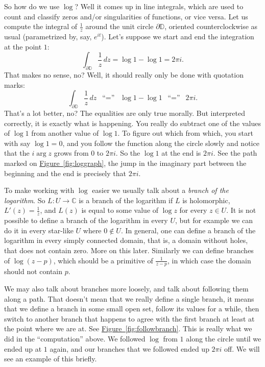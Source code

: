 \documentclass[12pt,openany]{book}
\newcommand{\C}{{\mathbb{C}}}
\newcommand{\D}{{\mathbb{D}}}
\newcommand{\myindex}[1]{#1\index{#1}}
\theoremstyle{plain}
\theoremstyle{remark}
\theoremstyle{definition}
\theoremstyle{exercise}
\theoremstyle{example}
\newcommand{\figureref}[1]{\hyperref[#1]{Figure~\ref*{#1}}}
\begin{document}
So how do we use $\log$?  Well it comes up in line integrals, which are used
to count and classify zeros and/or singularities of functions, or vice
versa.  Let us compute the integral of $\frac{1}{z}$ around the unit
circle $\partial \D$, oriented counterclockwise as usual (parametrized
by, say, $e^{it}$).  Let's suppose we start and end the integration at the
point $1$:
\begin{equation*}
\int_{\partial \D} \frac{1}{z} \, dz
= \log 1 - \log 1 = 2\pi i.
\end{equation*}
That makes no sense, no?  Well, it should really only be done
with quotation marks:
\begin{equation*}
\int_{\partial \D} \frac{1}{z} \, dz
\enspace
\text{``$=$''}
\enspace
\log 1 - \log 1
\enspace
\text{``$=$''}
\enspace
2\pi i.
\end{equation*}
That's a lot better, no?  The equalities are only true morally.  But
interpreted correctly, it is exactly what is happening.  You really do subtract
one of the values of $\log 1$ from another value of $\log 1$.  To figure
out which from which, you start with say $\log 1 = 0$, and you follow the
function along the circle slowly and notice that the $i \arg z$ grows from $0$ to
$2\pi i$.  So the $\log 1$ at the end is $2 \pi i$.  See the path
marked on \figureref{fig:loggraph}, the jump in the imaginary part between
the beginning and the end is precisely that $2\pi i$.

To make working with $\log$ easier we usually talk about a
\emph{\myindex{branch of the logarithm}}.  So $L \colon U \to \C$ is a branch
of the logarithm if $L$ is holomorphic, $L'(z) = \frac{1}{z}$, and $L(z)$ is equal
to some value of $\log z$ for every $z \in U$.  It is not possible to define
a branch of the logarithm in every $U$, but for example we can do it in every
star-like $U$ where $0 \notin U$.  In general, one can define a branch of
the logarithm in every simply connected domain, that is, a domain without holes,
that does not contain zero.
More on this later.  Similarly we can define branches of $\log (z-p)$, which
should be a primitive of $\frac{1}{z-p}$, in which case the domain
should not contain $p$.

We may also talk about branches more loosely, and talk
about following them along a path.  That doesn't mean that we really define
a single branch, it means that we define a branch in some small open set,
follow its values for a while, then switch to another branch that 
happens to agree with the first branch at least at the point where we are
at.  See \figureref{fig:followbranch}.  This is really what we did in the
``computation'' above.  We followed $\log$ from $1$ along the circle until we
ended up at $1$ again, and our branches that we followed ended up $2\pi i$
off.  We will see an example of this briefly.
\end{document}
